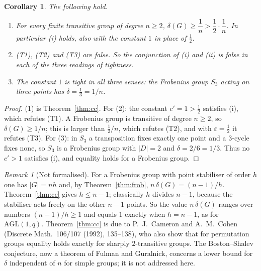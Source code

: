 \documentclass[11pt]{article}
\newtheorem{corollary}{Corollary}
\theoremstyle{remark}
\newtheorem{remark}{Remark}
\begin{document}
\begin{corollary}\label{cor:main}
The following hold.
\begin{enumerate}
\item For every finite transitive group of degree $n\ge2$,
 $\delta(G)\ge\dfrac1n>\dfrac12\cdot\dfrac1n$. In particular \textup{(i)}
 holds, also with the constant $1$ in place of $\tfrac12$.
\item \textup{(T1)}, \textup{(T2)} and \textup{(T3)} are false. So the
 conjunction of \textup{(i)} and \textup{(ii)} is false in each of the
 three readings of tightness.
\item The constant $1$ is tight in all three senses: the Frobenius
 group $S_3$ acting on three points has $\delta=\tfrac13=1/n$.
\end{enumerate}
\end{corollary}
\begin{proof}
(1) is Theorem~\ref{thm:cc}. For (2): the constant $c'=1>\tfrac12$
satisfies (i), which refutes (T1). A Frobenius group is transitive of
degree $n\ge2$, so $\delta(G)\ge1/n$; this is larger than
$\tfrac12/n$, which refutes (T2), and with $\varepsilon=\tfrac12$ it
refutes (T3). For (3): in $S_3$ a transposition fixes exactly one point
and a $3$-cycle fixes none, so $S_3$ is a Frobenius group with
$|D|=2$ and $\delta=2/6=1/3$. Thus no $c'>1$ satisfies (i), and equality
holds for a Frobenius group.
\end{proof}

\begin{remark}[Not formalised]
For a Frobenius group with point stabiliser of order $h$ one has
$|G|=nh$ and, by Theorem~\ref{thm:frob}, $n\,\delta(G)=(n-1)/h$.
Theorem~\ref{thm:cc} gives $h\le n-1$; classically $h$ divides $n-1$,
because the stabiliser acts freely on the other $n-1$ points. So the
value $n\,\delta(G)$ ranges over numbers $(n-1)/h\ge1$ and equals $1$
exactly when $h=n-1$, as for $\mathrm{AGL}(1,q)$.
Theorem~\ref{thm:cc} is due to P.~J.~Cameron and A.~M.~Cohen
(Discrete Math.\ 106/107 (1992), 135--138), who also show that for
permutation groups equality holds exactly for sharply $2$-transitive
groups. The Boston--Shalev conjecture, now a theorem of
Fulman and Guralnick, concerns a lower bound for $\delta$ independent of
$n$ for simple groups; it is not addressed here.
\end{remark}
\end{document}
